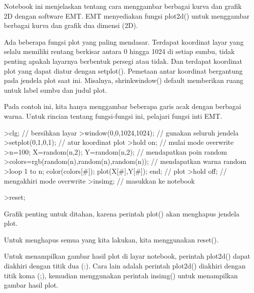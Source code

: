 \documentclass{article}
\begin{document}
\begin{eulernotebook}
\begin{eulercomment}
Notebook ini menjelaskan tentang cara menggambar berbagai kurva dan
grafik 2D dengan software EMT. EMT menyediakan fungsi plot2d() untuk
menggambar berbagai kurva dan grafik dua dimensi (2D).

\end{eulercomment}
\begin{eulercomment}
Ada beberapa fungsi plot yang paling mendasar. Terdapat koordinat
layar yang selalu memiliki rentang berkisar antara 0 hingga 1024 di
setiap sumbu, tidak penting apakah layarnya berbentuk persegi atau
tidak. Dan terdapat koordinat plot yang dapat diatur dengan setplot().
Pemetaan antar koordinat bergantung pada jendela plot saat ini.
Misalnya, shrinkwindow() default memberikan ruang untuk label sumbu
dan judul plot.

Pada contoh ini, kita hanya menggambar beberapa garis acak dengan
berbagai warna. Untuk rincian tentang fungsi-fungsi ini, pelajari
fungsi inti EMT.
\end{eulercomment}
\begin{eulerprompt}
>clg; // bersihkan layar
>window(0,0,1024,1024); // gunakan seluruh jendela
>setplot(0,1,0,1); // atur koordinat plot
>hold on; // mulai mode overwrite
>n=100; X=random(n,2); Y=random(n,2);  // mendapatkan poin random
>colors=rgb(random(n),random(n),random(n)); // mendapatkan warna random
>loop 1 to n; color(colors[#]); plot(X[#],Y[#]); end; // plot
>hold off; // mengakhiri mode overwrite
>insimg; // masukkan ke notebook
\end{eulerprompt}
\begin{eulerprompt}
>reset;
\end{eulerprompt}
\begin{eulercomment}
Grafik penting untuk ditahan, karena perintah plot() akan menghapus
jendela plot.

Untuk menghapus semua yang kita lakukan, kita menggunakan reset().

Untuk menampilkan gambar hasil plot di layar notebook, perintah
plot2d() dapat diakhiri dengan titik dua (:). Cara lain adalah
perintah plot2d() diakhiri dengan titik koma (;), kemudian menggunakan
perintah insimg() untuk menampilkan gambar hasil plot.


\end{eulercomment}
\end{eulernotebook}
\end{document}
